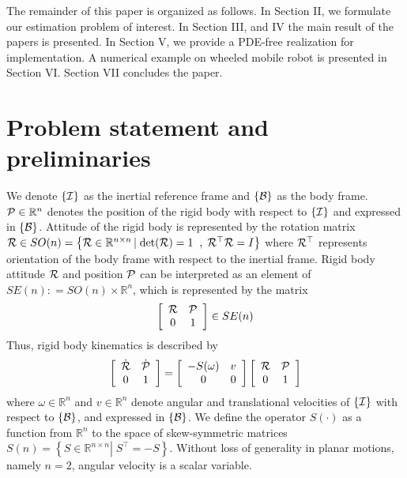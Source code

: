 \documentclass[12pt,draftcls,onecolumn]{IEEEtran}
\begin{document}
The remainder of this paper is organized as follows. In Section II, we formulate our estimation problem of interest. In Section III, and IV the main result of the papers is presented. In Section V, we provide a PDE-free realization for implementation. 
A numerical example on wheeled mobile robot is presented in Section VI. Section VII concludes the paper.
\section{Problem statement and preliminaries}

We denote $\left\{ {\cal I} \right\}$ as the inertial reference frame and $\left\{ {\cal B} \right\}$ as the body frame.  ${\cal P} \in {\mathbb R}^n$ denotes the position of the rigid body with respect to  $\left\{ {\cal I} \right\}$ and expressed in $\left\{ {\cal B} \right\}$. Attitude of the rigid body is represented by the rotation matrix ${\cal R} \in SO(n) = \left\{ {{\cal R} \in {{\mathbb R}^{n \times n}}\left| {\;\det ({\cal R}) = 1} \right.\;,\;{{\cal R}^{\top} }{\cal R} = I} \right\}$ where ${\cal R}^\top$ represents orientation of the body frame with respect to the inertial frame.
Rigid body attitude ${\cal R}$ and position ${\cal P}$ can be interpreted as an element of $ SE(n): = SO(n) \times {\mathbb R}^n$, which is represented by the matrix $$\left[ {\begin{array}{*{20}{c}} {\cal R}&{\cal P}\\ 0&1 \end{array}} \right] \in SE(n)$$ Thus, rigid body kinematics is described by
\begin{equation} \label{e1}
\left[ {\begin{array}{*{20}{c}}
{\dot {\cal R}}&{\dot {\cal P}}\\
0&1
\end{array}} \right] = \left[ {\begin{array}{*{20}{c}}
{ - S(\omega )}&v\\
0&0
\end{array}} \right]\left[ {\begin{array}{*{20}{c}}
{\cal R}&{\cal P}\\
0&1
\end{array}} \right]
\end{equation}
where $\omega  \in {\mathbb R}^n$ and $v \in {\mathbb R}^n$ denote angular and translational velocities of $\left\{ {\cal I} \right\}$ with respect to $\left\{ {\cal B} \right\}$, and expressed in $\left\{ {\cal B} \right\}$. We define the operator $S(\cdot)$ as a function from ${\mathbb R}^n$  to the space of skew-symmetric matrices $ S(n) = \left\{ {S \in {{\mathbb R}^{n \times n}}\left| \; \right. {S^{\top} } =  - S} \right\}$. Without loss of generality in planar motions,  namely $n=2$, angular velocity is a scalar variable. 
\end{document}
